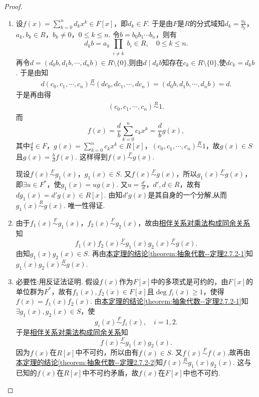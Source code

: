\documentclass[../../main.tex]{subfiles}%
\begin{document}
\begin{proof}
\begin{enumerate}[(1)]
\item 设$f(x)=\sum\limits_{k=0}^n d_kx^k \in F[x]$，即$d_k \in F$. 于是由$F$是$R$的分式域知$d_k = \frac{a_k}{b_k}$，$a_k, b_k \in R$，$b_k \neq 0$，$0 \leqslant k \leqslant n$. 令$b = b_0b_1\cdots b_n$，则有
\[
d_kb = a_k \prod_{\substack{i \neq k}} b_i \in R, \quad 0 \leqslant k \leqslant n.
\]
再令$d = (d_0b, d_1b, \cdots, d_nb)\in R\setminus \{0\}$,则由$d\mid d_kb$知存在$c_k\in R\setminus \{0\}$,使$ dc_k= d_kb$.
于是由知
\begin{align*}
d\left( c_0,c_1,\cdots ,c_n \right) \stackrel{R}{\sim} \left( dc_0,dc_1,\cdots ,dc_n \right) =\left( d_0b,d_1b,\cdots ,d_nb \right) =d.
\end{align*}
于是再由得
\begin{align*}
\left( c_0,c_1,\cdots ,c_n \right) \stackrel{R}{\sim} 1.
\end{align*}
而
\[
f(x) = \frac{d}{b} \sum\limits_{k=0}^n c_kx^k = \frac{d}{b}g(x),
\]
其中$\frac{d}{b} \in F$，$g(x) = \sum\limits_{k=0}^n c_kx^k \in R[x]$，$(c_0, c_1, \cdots, c_n) \stackrel{R}{\sim} 1$，故$g(x) \in S$且$g(x)=\frac{b}{d}f(x).$ 这样得到$f(x) \stackrel{F}{\sim} g(x)$.

现设$f(x) \stackrel{F}{\sim} g_1(x)$，$g_1(x) \in S$. 又$f(x) \stackrel{F}{\sim} g(x)$，所以$g_1(x) \stackrel{F}{\sim} g(x)$，即$\exists u \in F^*$，使$g_1(x) = ug(x)$. 又$u = \frac{d'}{d}$，$d', d \in R$，故有$dg_1(x) = d'g(x) \in R[x]$. 由知$d'g(x)$是其自身的一个分解,从而$g_1(x) \stackrel{R}{\sim} g(x)$. 唯一性得证.
\item 由于$f_1(x) \stackrel{F}{\sim} g_1(x)$，$f_2(x) \stackrel{F}{\sim} g_2(x)$，故由\hyperref[theorem:单位群整除的基本性质-8]{相伴关系对乘法构成同余关系}知
\[
f_1(x)f_2(x) \stackrel{F}{\sim} g_1(x)g_2(x) \stackrel{F}{\sim} g(x).
\]
由知$g_1(x)g_2(x) \in S$. 再由\hyperref[theorem:抽象代数--定理2.7.2-1]{本定理的结论\ref{theorem:抽象代数--定理2.7.2-1}}知$g_1(x)g_2(x) \stackrel{R}{\sim} g(x)$.
\item {\heiti 必要性:}用反证法证明. 假设$f(x)$作为$F[x]$中的多项式是可约的，由$F[x]$的单位群为$F^*$，故有$f_1(x), f_2(x) \in F[x]$且$\deg f_i(x) \geqslant 1$，使得$f(x) = f_1(x)f_2(x)$. 由\hyperref[theorem:抽象代数--定理2.7.2-1]{本定理的结论\ref{theorem:抽象代数--定理2.7.2-1}}知$\exists g_1(x), g_2(x) \in S$，使
\[
g_i(x) \stackrel{F}{\sim} f_i(x), \quad i=1,2.
\]
于是\hyperref[theorem:单位群整除的基本性质-8]{相伴关系对乘法构成同余关系}知
\[
f(x) \stackrel{F}{\sim} g_1(x)g_2(x).
\]
因为$f(x)$在$R[x]$中不可约，所以由有$f(x) \in S$. 又$f(x)\stackrel{F}{\sim} f(x)$,故再由\hyperref[theorem:抽象代数--定理2.7.2-2]{本定理的结论\ref{theorem:抽象代数--定理2.7.2-2}}知$f(x) \stackrel{R}{\sim} g_1(x)g_2(x)$. 这与已知的$f(x)$在$R[x]$中不可约矛盾，故$f(x)$在$F[x]$中也不可约.


\end{enumerate}
\end{proof}
\end{document}

